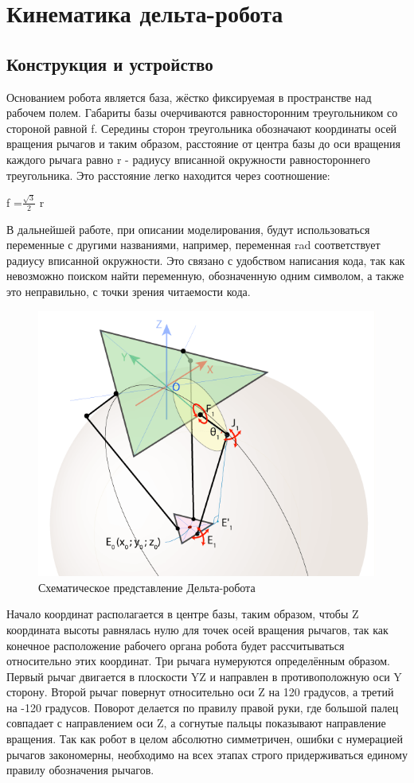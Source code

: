 \section{Кинематика дельта-робота}
\subsection{Конструкция и устройство}
Основанием робота является база, жёстко фиксируемая в пространстве над рабочем полем. Габариты базы очерчиваются равносторонним треугольником со стороной равной f. Середины сторон треугольника обозначают координаты осей вращения рычагов и таким образом, расстояние от центра базы до оси вращения каждого рычага равно r - радиусу вписанной окружности равностороннего треугольника. Это расстояние легко находится через соотношение:
\begin{center}
f =$\frac{\sqrt{3}}{2}$  r
\end{center}

В дальнейшей работе, при описании моделирования, будут использоваться переменные с другими названиями, например, переменная rad  соответствует радиусу вписанной окружности. Это связано с удобством написания кода, так как невозможно поиском найти переменную, обозначенную одним символом, а также это неправильно, с точки зрения читаемости кода.

\begin{figure}[h!]
	\centering
	\includegraphics[width=0.8\linewidth]{./image/deltabot}
	\caption{Схематическое представление Дельта-робота}
\end{figure}

Начало координат располагается в центре базы, таким образом, чтобы Z координата высоты равнялась нулю для точек осей вращения рычагов, так как конечное расположение рабочего органа робота будет рассчитываться относительно этих координат. Три рычага нумеруются определённым образом. Первый рычаг двигается в плоскости YZ и направлен в противоположную оси Y сторону. Второй рычаг повернут относительно оси Z на 120 градусов, а третий на -120 градусов. Поворот делается по правилу правой руки, где большой палец совпадает с направлением оси Z, а согнутые пальцы показывают направление вращения. Так как робот в целом абсолютно симметричен, ошибки с нумерацией рычагов закономерны, необходимо на всех этапах строго придерживаться единому правилу обозначения рычагов.

